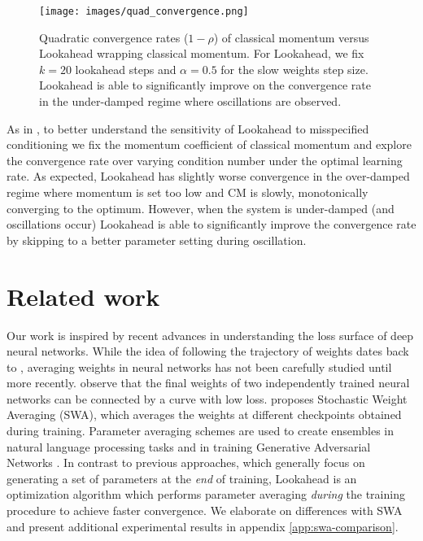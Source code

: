 \documentclass{article}
\begin{document}
\begin{wrapfigure}{r}{0.6 \textwidth}
    \centering
    \vspace{-0.2cm}
    \texttt{[image: images/quad\_convergence.png]}
    \vspace{-0.2cm}
    \caption{Quadratic convergence rates ($1-\rho$) of classical momentum versus Lookahead wrapping classical momentum. For Lookahead, we fix $k=20$ lookahead steps and $\alpha=0.5$ for the slow weights step size. Lookahead is able to significantly improve on the convergence rate in the under-damped regime where oscillations are observed.}
    \label{fig:quad_convergence}
\end{wrapfigure}

As in \citet{lucas2018aggregated}, to better understand the sensitivity of Lookahead to misspecified conditioning we fix the momentum coefficient of classical momentum and explore the convergence rate over varying condition number under the optimal learning rate.
As expected, Lookahead has slightly worse convergence in the over-damped regime where momentum is set too low and CM is slowly, monotonically converging to the optimum. However, when the system is under-damped (and oscillations occur) Lookahead is able to significantly improve the convergence rate by skipping to a better parameter setting during oscillation.








  \section{Related work}
\label{sec:related}
Our work is inspired by recent advances in understanding the loss surface of deep neural networks. While the idea of following the trajectory of weights dates back to \citet{ruppert1988efficient, polyak1992acceleration}, averaging weights in neural networks has not been carefully studied until more recently. \citet{garipov2018loss} observe that the final weights of two independently trained neural networks can be connected by a curve with low loss. \citet{izmailov2018averaging} proposes Stochastic Weight Averaging (SWA), which averages the weights at different checkpoints obtained during training. Parameter averaging schemes are used to create ensembles in natural language processing tasks \citep{jean2014using, merity2017regularizing} and in training Generative Adversarial Networks \citep{yasin2018averaging}. In contrast to previous approaches, which generally focus on generating a set of parameters at the \emph{end} of training, Lookahead is an optimization algorithm which performs parameter averaging \emph{during} the training procedure to achieve faster convergence. We elaborate on differences with SWA and present additional experimental results in appendix \ref{app:swa-comparison}.
\end{document}
